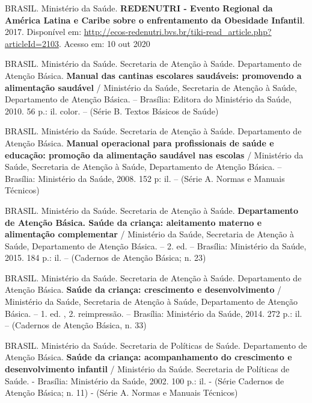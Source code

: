 \noindent BRASIL. Ministério da Saúde. \textbf{REDENUTRI - Evento Regional da América Latina e Caribe sobre o enfrentamento da Obesidade Infantil}. 2017. Disponível em: \url{http://ecos-redenutri.bvs.br/tiki-read\_article.php?articleId=2103}. Acesso em: 10 out 2020

\bigbreak

\noindent BRASIL. Ministério da Saúde. Secretaria de Atenção à Saúde. Departamento de Atenção Básica. \textbf{Manual das cantinas escolares saudáveis: promovendo a alimentação saudável} / Ministério da Saúde, Secretaria de Atenção à Saúde, Departamento de Atenção Básica. – Brasília: Editora do Ministério da Saúde, 2010. 56 p.: il. color. – (Série B. Textos Básicos de Saúde)

\bigbreak

\noindent BRASIL. Ministério da Saúde. Secretaria de Atenção à Saúde. Departamento de Atenção Básica. \textbf{Manual operacional para profissionais de saúde e educação: promoção da alimentação saudável nas escolas} / Ministério da Saúde, Secretaria de Atenção à Saúde, Departamento de Atenção Básica. – Brasília: Ministério da Saúde, 2008. 152 p: il. – (Série A. Normas e Manuais Técnicos)

\bigbreak

\noindent BRASIL. Ministério da Saúde. Secretaria de Atenção à Saúde. \textbf{Departamento de Atenção Básica. Saúde da criança: aleitamento materno e alimentação complementar} / Ministério da Saúde, Secretaria de Atenção à Saúde, Departamento de Atenção Básica. – 2. ed. – Brasília: Ministério da Saúde, 2015. 184 p.: il. – (Cadernos de Atenção Básica; n. 23)

\bigbreak

\noindent BRASIL. Ministério da Saúde. Secretaria de Atenção à Saúde. Departamento de Atenção Básica. \textbf{Saúde da criança: crescimento e desenvolvimento} / Ministério da Saúde, Secretaria de Atenção à Saúde, Departamento de Atenção Básica. – 1. ed. , 2. reimpressão. – Brasília: Ministério da Saúde, 2014. 272 p.: il. – (Cadernos de Atenção Básica, n. 33)

\bigbreak

\noindent BRASIL. Ministério da Saúde. Secretaria de Políticas de Saúde. Departamento de Atenção Básica. \textbf{Saúde da criança: acompanhamento do crescimento e desenvolvimento infantil} / Ministério da Saúde. Secretaria de Políticas de Saúde. - Brasília: Ministério da Saúde, 2002. 100 p.: il. - (Série Cadernos de Atenção Básica; n. 11) - (Série A. Normas e Manuais Técnicos)
\bigbreak

